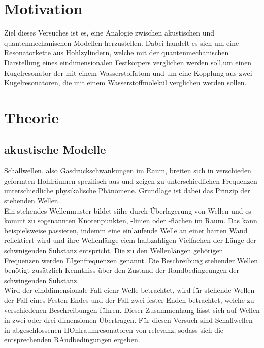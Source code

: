 \section{Motivation}
\label{sec:Motivation}
Ziel dieses Versuches ist es, eine Analogie zwischen akustischen und quantenmechanischen Modellen herzustellen.
Dabei handelt es sich um eine Resonatorkette aus Hohlzylindern, welche mit der quantenmechanischen Darstellung eines 
eindimensionalen Festkörpers verglichen werden soll,um einen Kugelresonator der mit einem Wasserstoffatom und um eine Kopplung aus zwei Kugelresonatoren, 
die mit einem Wasserstoffmolekül verglichen werden sollen.

\section{Theorie}
\label{sec:Theorie}

\subsection{akustische Modelle}
Schallwellen, also Gasdruckschwankungen im Raum, breiten sich in verschieden geformten 
Hohlräumen spezifisch aus und zeigen zu unterschiedlichen Frequenzen unterschiedliche 
physikalische Phänomene. Grundlage ist dabei das Prinzip der stehenden Wellen.\\

Ein stehendes Wellenmuster bildet siihc durch Überlagerung von Wellen  und es kommt zu 
sogenannten Knotenpunkten, -linien oder -flächen im Raum. Das kann beispielsweise 
passieren, indemm  eine einlaufende Welle an einer harten Wand reflektiert wird und ihre 
Wellenlänge eiem halbzahligen Vielfachen der Länge der schwnigenden Substanz entspricht.
Die zu den Wellenlängen gehörigen Frequenzen werden EIgenfrequenzen genannt.
Die Beschreibung stehender Wellen benötigt zusätzlich Kenntniss über den Zustand der 
Randbedingeungen der schwingenden Substanz.\\

Wird der einddimensionale Fall eienr Welle betrachtet, wird für stehende Wellen der Fall 
eines Festen Endes und der Fall zwei fester Enden betrachtet, welche zu verschiedenen 
Beschreibungen führen. Dieser Zusammenhang lässt 
sich auf Wellen in zwei oder drei dimensionen Übertragen. Für diesen Versuch sind 
Schallwellen in abgeschlossenen HOhlraumresonatoren von relevanz, sodass
sich die entsprechenden RAndbedingungen ergeben.\\

